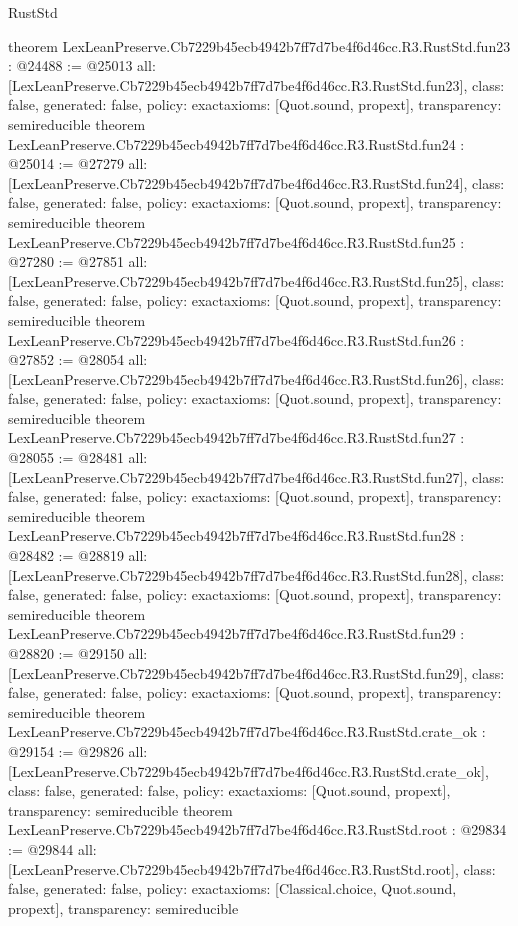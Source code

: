 \begin{lexlean}{RustStd}
\begin{coremodule}
{}
theorem LexLeanPreserve.Cb7229b45ecb4942b7ff7d7be4f6d46cc.R3.RustStd.fun23 : @24488 := @25013 {
  all: [LexLeanPreserve.Cb7229b45ecb4942b7ff7d7be4f6d46cc.R3.RustStd.fun23],
  class: false,
  generated: false,
  policy: exact{axioms: [Quot.sound, propext]},
  transparency: semireducible
}
theorem LexLeanPreserve.Cb7229b45ecb4942b7ff7d7be4f6d46cc.R3.RustStd.fun24 : @25014 := @27279 {
  all: [LexLeanPreserve.Cb7229b45ecb4942b7ff7d7be4f6d46cc.R3.RustStd.fun24],
  class: false,
  generated: false,
  policy: exact{axioms: [Quot.sound, propext]},
  transparency: semireducible
}
theorem LexLeanPreserve.Cb7229b45ecb4942b7ff7d7be4f6d46cc.R3.RustStd.fun25 : @27280 := @27851 {
  all: [LexLeanPreserve.Cb7229b45ecb4942b7ff7d7be4f6d46cc.R3.RustStd.fun25],
  class: false,
  generated: false,
  policy: exact{axioms: [Quot.sound, propext]},
  transparency: semireducible
}
theorem LexLeanPreserve.Cb7229b45ecb4942b7ff7d7be4f6d46cc.R3.RustStd.fun26 : @27852 := @28054 {
  all: [LexLeanPreserve.Cb7229b45ecb4942b7ff7d7be4f6d46cc.R3.RustStd.fun26],
  class: false,
  generated: false,
  policy: exact{axioms: [Quot.sound, propext]},
  transparency: semireducible
}
theorem LexLeanPreserve.Cb7229b45ecb4942b7ff7d7be4f6d46cc.R3.RustStd.fun27 : @28055 := @28481 {
  all: [LexLeanPreserve.Cb7229b45ecb4942b7ff7d7be4f6d46cc.R3.RustStd.fun27],
  class: false,
  generated: false,
  policy: exact{axioms: [Quot.sound, propext]},
  transparency: semireducible
}
theorem LexLeanPreserve.Cb7229b45ecb4942b7ff7d7be4f6d46cc.R3.RustStd.fun28 : @28482 := @28819 {
  all: [LexLeanPreserve.Cb7229b45ecb4942b7ff7d7be4f6d46cc.R3.RustStd.fun28],
  class: false,
  generated: false,
  policy: exact{axioms: [Quot.sound, propext]},
  transparency: semireducible
}
theorem LexLeanPreserve.Cb7229b45ecb4942b7ff7d7be4f6d46cc.R3.RustStd.fun29 : @28820 := @29150 {
  all: [LexLeanPreserve.Cb7229b45ecb4942b7ff7d7be4f6d46cc.R3.RustStd.fun29],
  class: false,
  generated: false,
  policy: exact{axioms: [Quot.sound, propext]},
  transparency: semireducible
}
theorem LexLeanPreserve.Cb7229b45ecb4942b7ff7d7be4f6d46cc.R3.RustStd.crate_ok : @29154 := @29826 {
  all: [LexLeanPreserve.Cb7229b45ecb4942b7ff7d7be4f6d46cc.R3.RustStd.crate_ok],
  class: false,
  generated: false,
  policy: exact{axioms: [Quot.sound, propext]},
  transparency: semireducible
}
theorem LexLeanPreserve.Cb7229b45ecb4942b7ff7d7be4f6d46cc.R3.RustStd.root : @29834 := @29844 {
  all: [LexLeanPreserve.Cb7229b45ecb4942b7ff7d7be4f6d46cc.R3.RustStd.root],
  class: false,
  generated: false,
  policy: exact{axioms: [Classical.choice, Quot.sound, propext]},
  transparency: semireducible
}


\end{coremodule}
\end{lexlean}
